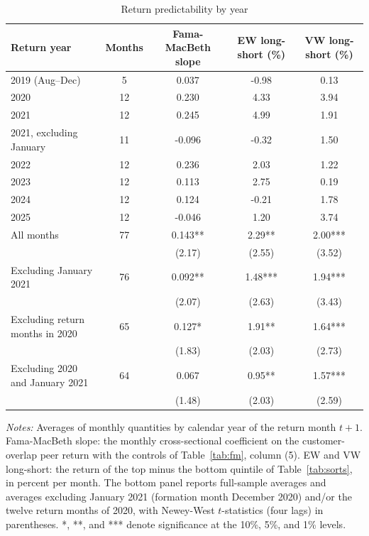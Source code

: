 \begin{table}[!htbp]\centering
\caption{Return predictability by year}\label{tab:byyear}
\footnotesize
\begin{tabular*}{\linewidth}{@{\extracolsep{\fill}}lcccc}
\toprule
Return year & Months & Fama-MacBeth slope & EW long-short (\%) & VW long-short (\%) \\
\midrule
2019 (Aug--Dec) & 5 & 0.037 & -0.98 & 0.13 \\
2020 & 12 & 0.230 & 4.33 & 3.94 \\
2021 & 12 & 0.245 & 4.99 & 1.91 \\
2021, excluding January & 11 & -0.096 & -0.32 & 1.50 \\
2022 & 12 & 0.236 & 2.03 & 1.22 \\
2023 & 12 & 0.113 & 2.75 & 0.19 \\
2024 & 12 & 0.124 & -0.21 & 1.78 \\
2025 & 12 & -0.046 & 1.20 & 3.74 \\
\addlinespace
All months & 77 & 0.143** & 2.29** & 2.00*** \\
 &  & (2.17) & (2.55) & (3.52) \\
Excluding January 2021 & 76 & 0.092** & 1.48*** & 1.94*** \\
 &  & (2.07) & (2.63) & (3.43) \\
Excluding return months in 2020 & 65 & 0.127* & 1.91** & 1.64*** \\
 &  & (1.83) & (2.03) & (2.73) \\
Excluding 2020 and January 2021 & 64 & 0.067 & 0.95** & 1.57*** \\
 &  & (1.48) & (2.03) & (2.59) \\
\bottomrule
\end{tabular*}
\par\vspace{4pt}\begin{minipage}{\linewidth}\scriptsize \emph{Notes:} Averages of monthly quantities by calendar year of the return month $t+1$. Fama-MacBeth slope: the monthly cross-sectional coefficient on the customer-overlap peer return with the controls of Table~\ref{tab:fm}, column (5). EW and VW long-short: the return of the top minus the bottom quintile of Table~\ref{tab:sorts}, in percent per month. The bottom panel reports full-sample averages and averages excluding January 2021 (formation month December 2020) and/or the twelve return months of 2020, with Newey-West $t$-statistics (four lags) in parentheses. *, **, and *** denote significance at the 10\%, 5\%, and 1\% levels.\end{minipage}
\end{table}